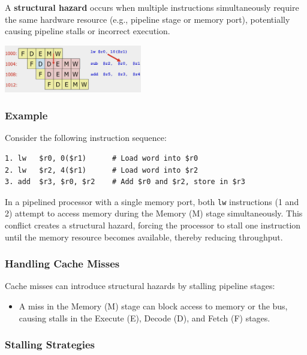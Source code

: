 A \textbf{structural hazard} occurs when multiple instructions simultaneously require the same hardware resource (e.g., pipeline stage or memory port), potentially causing pipeline stalls or incorrect execution.

\begin{center}
\includegraphics[width=0.45\textwidth]{chapters/chapter4c/images/struct_hazard.png}
\end{center}

\subsubsection{Example}

Consider the following instruction sequence:

\begin{verbatim}
1. lw   $r0, 0($r1)      # Load word into $r0
2. lw   $r2, 4($r1)      # Load word into $r2
3. add  $r3, $r0, $r2    # Add $r0 and $r2, store in $r3
\end{verbatim}

In a pipelined processor with a single memory port, both \texttt{lw} instructions (1 and 2) attempt to access memory during the Memory (M) stage simultaneously. This conflict creates a structural hazard, forcing the processor to stall one instruction until the memory resource becomes available, thereby reducing throughput.

\subsubsection{Handling Cache Misses}

Cache misses can introduce structural hazards by stalling pipeline stages:

\begin{itemize}
    \item A miss in the Memory (M) stage can block access to memory or the bus, causing stalls in the Execute (E), Decode (D), and Fetch (F) stages.
\end{itemize}

\subsubsection{Stalling Strategies}


